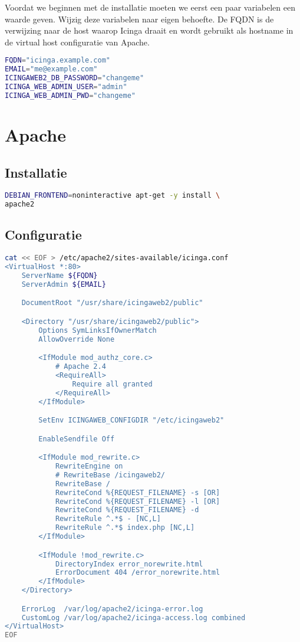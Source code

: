 Voordat we beginnen met de installatie moeten we eerst een paar variabelen een waarde geven. Wijzig deze variabelen naar eigen behoefte. De FQDN is de verwijzing naar de host waarop Icinga draait en wordt gebruikt als hostname in de virtual host configuratie van Apache.
\begin{lstlisting}[language=bash]
FQDN="icinga.example.com"
EMAIL="me@example.com"
ICINGAWEB2_DB_PASSWORD="changeme"
ICINGA_WEB_ADMIN_USER="admin"
ICINGA_WEB_ADMIN_PWD="changeme"
\end{lstlisting}


\section{Apache}

\subsection{Installatie}
\begin{lstlisting}[language=bash]
DEBIAN_FRONTEND=noninteractive apt-get -y install \
apache2
\end{lstlisting}

\subsection{Configuratie}
\begin{lstlisting}[language=bash]
cat << EOF > /etc/apache2/sites-available/icinga.conf
<VirtualHost *:80>
    ServerName ${FQDN}
    ServerAdmin ${EMAIL}

    DocumentRoot "/usr/share/icingaweb2/public"

    <Directory "/usr/share/icingaweb2/public">
        Options SymLinksIfOwnerMatch
        AllowOverride None

        <IfModule mod_authz_core.c>
            # Apache 2.4
            <RequireAll>
                Require all granted
            </RequireAll>
        </IfModule>

        SetEnv ICINGAWEB_CONFIGDIR "/etc/icingaweb2"

        EnableSendfile Off

        <IfModule mod_rewrite.c>
            RewriteEngine on
            # RewriteBase /icingaweb2/
            RewriteBase /
            RewriteCond %{REQUEST_FILENAME} -s [OR]
            RewriteCond %{REQUEST_FILENAME} -l [OR]
            RewriteCond %{REQUEST_FILENAME} -d
            RewriteRule ^.*$ - [NC,L]
            RewriteRule ^.*$ index.php [NC,L]
        </IfModule>

        <IfModule !mod_rewrite.c>
            DirectoryIndex error_norewrite.html
            ErrorDocument 404 /error_norewrite.html
        </IfModule>
    </Directory>

    ErrorLog  /var/log/apache2/icinga-error.log
    CustomLog /var/log/apache2/icinga-access.log combined
</VirtualHost>
EOF
\end{lstlisting}

